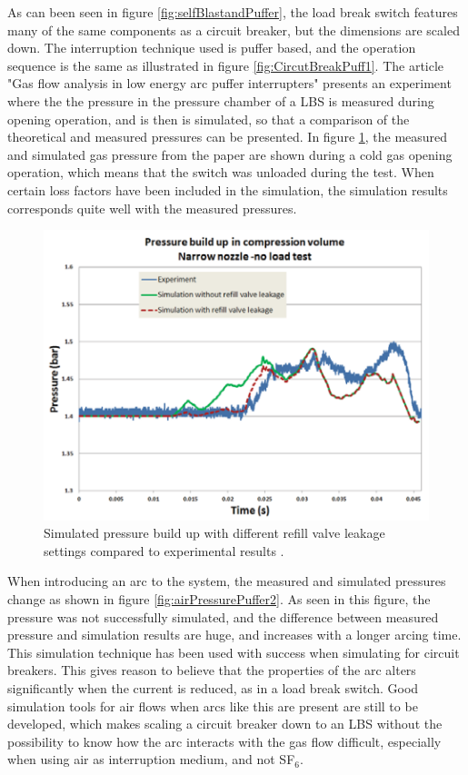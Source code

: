 \documentclass[10pt,b5paper,twoside]{article}
\begin{document}
As can been seen in figure \ref{fig:selfBlastandPuffer}, the load break switch features many of the same components as a circuit breaker, but the dimensions are scaled down. The interruption technique used is puffer based, and the operation sequence is the same as illustrated in figure \ref{fig:CircutBreakPuff1}. The article "Gas flow analysis in low energy arc puffer interrupters" presents an experiment where the the pressure in the pressure chamber of a LBS is measured during opening operation, and is then is simulated, so that a comparison of the theoretical and measured pressures can be presented. In figure \ref{fig:airPressurePuffer}, the measured and simulated gas pressure from the paper are shown during a cold gas opening operation, which means that the switch was unloaded during the test. When certain loss factors have been included in the simulation, the simulation results corresponds quite well with the measured pressures.


\begin{figure} [H]
\centering
\includegraphics[scale=0.6]{Bilder/Theory/tankPressure.png}
\caption{Simulated pressure build up with different refill valve leakage settings compared to experimental results  \cite{bib:CBAC}.} \label{fig:airPressurePuffer}
\end{figure}

When introducing an arc to the system, the measured and simulated pressures change as shown in figure \ref{fig:airPressurePuffer2}. As seen in this figure, the pressure was not successfully simulated, and the difference between measured pressure and simulation results are huge, and increases with a longer arcing time. This simulation technique has been used with success when simulating for circuit breakers. This gives reason to believe that the properties of the arc alters significantly when the current is reduced, as in a load break switch. Good simulation tools for air flows when arcs like this are present are still to be developed, which makes scaling a circuit breaker down to an LBS without the possibility to know how the arc interacts with the gas flow difficult, especially when using air as interruption medium, and not SF$_6$.
\end{document}
